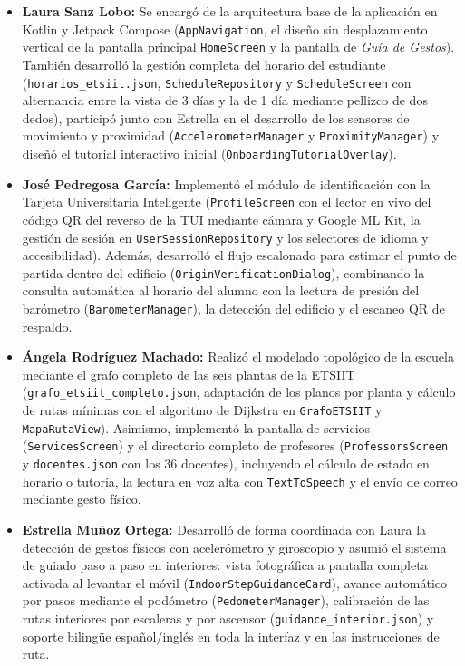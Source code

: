 \documentclass[11pt,a4paper]{article}
\begin{document}
\begin{itemize}[leftmargin=1.6em, itemsep=0.55em]
    \item \textbf{Laura Sanz Lobo:} Se encargó de la arquitectura base de la aplicación en Kotlin y Jetpack Compose (\texttt{AppNavigation}, el diseño sin desplazamiento vertical de la pantalla principal \texttt{HomeScreen} y la pantalla de \textit{Guía de Gestos}). También desarrolló la gestión completa del horario del estudiante (\texttt{horarios\_etsiit.json}, \texttt{ScheduleRepository} y \texttt{ScheduleScreen} con alternancia entre la vista de 3 días y la de 1 día mediante pellizco de dos dedos), participó junto con Estrella en el desarrollo de los sensores de movimiento y proximidad (\texttt{AccelerometerManager} y \texttt{ProximityManager}) y diseñó el tutorial interactivo inicial (\texttt{OnboardingTutorialOverlay}).

    \item \textbf{José Pedregosa García:} Implementó el módulo de identificación con la Tarjeta Universitaria Inteligente (\texttt{ProfileScreen} con el lector en vivo del código QR del reverso de la TUI mediante cámara y Google ML Kit, la gestión de sesión en \texttt{UserSessionRepository} y los selectores de idioma y accesibilidad). Además, desarrolló el flujo escalonado para estimar el punto de partida dentro del edificio (\texttt{OriginVerificationDialog}), combinando la consulta automática al horario del alumno con la lectura de presión del barómetro (\texttt{BarometerManager}), la detección del edificio y el escaneo QR de respaldo.

    \item \textbf{Ángela Rodríguez Machado:} Realizó el modelado topológico de la escuela mediante el grafo completo de las seis plantas de la ETSIIT (\texttt{grafo\_etsiit\_completo.json}, adaptación de los planos por planta y cálculo de rutas mínimas con el algoritmo de Dijkstra en \texttt{GrafoETSIIT} y \texttt{MapaRutaView}). Asimismo, implementó la pantalla de servicios (\texttt{ServicesScreen}) y el directorio completo de profesores (\texttt{ProfessorsScreen} y \texttt{docentes.json} con los 36 docentes), incluyendo el cálculo de estado en horario o tutoría, la lectura en voz alta con \texttt{TextToSpeech} y el envío de correo mediante gesto físico.

    \item \textbf{Estrella Muñoz Ortega:} Desarrolló de forma coordinada con Laura la detección de gestos físicos con acelerómetro y giroscopio y asumió el sistema de guiado paso a paso en interiores: vista fotográfica a pantalla completa activada al levantar el móvil (\texttt{IndoorStepGuidanceCard}), avance automático por pasos mediante el podómetro (\texttt{PedometerManager}), calibración de las rutas interiores por escaleras y por ascensor (\texttt{guidance\_interior.json}) y soporte bilingüe español/inglés en toda la interfaz y en las instrucciones de ruta.


\end{itemize}
\end{document}
